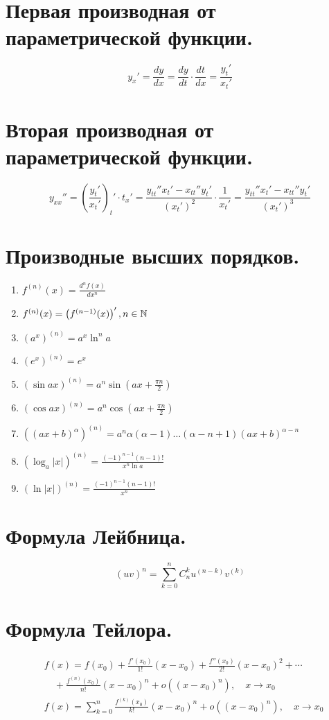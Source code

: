 \documentclass[a4paper,14pt]{article}
\begin{document}
    \section{Первая производная от параметрической функции.}
    \[y_x'=\frac{dy}{dx}=\frac{dy}{dt}\cdot \frac{dt}{dx}=\frac{y_t'}{x_t'}\]
    \section{Вторая производная от параметрической функции.}
    \[y_{xx}''=\left(\frac{y_t'}{x_t'}\right)_t'\cdot t_x'=\frac{y_{tt}''x_t'-x_{tt}''y_t'}{(x_t')^2}\cdot \frac{1}{x_t'}=\frac{y_{tt}''x_t'-x_{tt}''y_t'}{(x_t')^3}\]
    \section{Производные высших порядков.}
    \begin{enumerate}
        \item $f^{(n)}(x)=\frac{d^nf(x)}{dx^n}$
        \item $f^{(n)}(x)=\left(f^{(n-1)}(x)\right)', n\in \mathbb{N}$
        \item $(a^x)^{(n)}=a^x \ln^n a$
        \item $(e^x)^{(n)}=e^x$
        \item $\left(\sin ax\right)^{(n)}=a^n\sin(ax+\frac{\pi n}{2})$
        \item $\left(\cos ax\right)^{(n)}=a^n\cos(ax+\frac{\pi n}{2})$
        \item $\left((ax+b)^\alpha\right)^{(n)}=a^n\alpha(\alpha-1)\dots(\alpha-n+1)(ax+b)^{\alpha-n}$
        \item $\left(\log_a |x|\right)^{(n)}=\frac{(-1)^{n-1}(n-1)!}{x^n\ln a}$
        \item $\left(\ln |x|\right)^{(n)}=\frac{(-1)^{n-1}(n-1)!}{x^n}$
    \end{enumerate}
    \section{Формула Лейбница.}
    \[(uv)^n=\sum_{k=0}^n C_n^k u^{(n-k)}v^{(k)}\]
    \section{Формула Тейлора.}
    \begin{align}
        &f(x) = f(x_0) + \frac{f'(x_0)}{1!}(x - x_0) + \frac{f''(x_0)}{2!}(x - x_0)^2 + \cdots \nonumber \\
        &\quad + \frac{f^{(n)}(x_0)}{n!}(x - x_0)^n + o\left((x - x_0)^n\right), \quad x \rightarrow x_0 \nonumber\\
        &f(x)=\sum_{k=0}^{n} \frac{f^{(k)}(x_0)}{k!}(x-x_0)^n+ o\left((x - x_0)^n\right), \quad x \rightarrow x_0
    \end{align}
\end{document}
